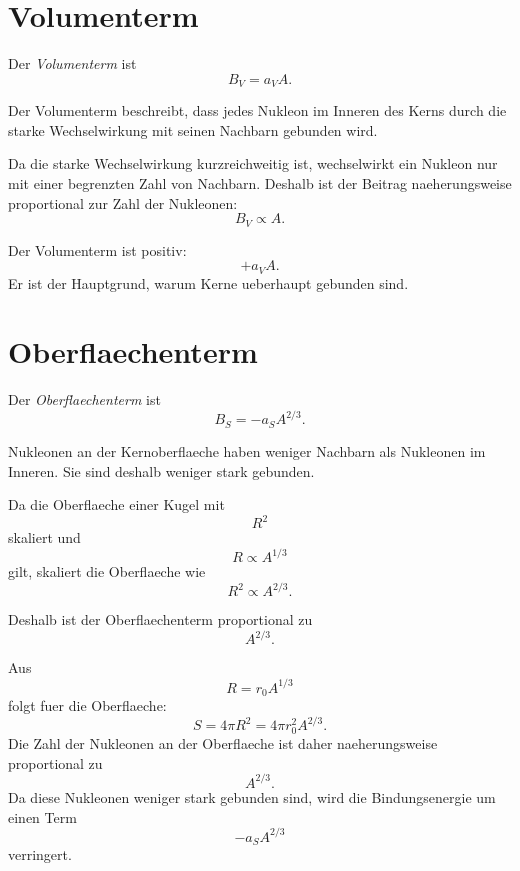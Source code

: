 \section{Volumenterm}

\begin{definitionbox}
Der \emph{Volumenterm} ist
\[
    B_V = a_V A.
\]
\end{definitionbox}

\begin{conceptbox}
Der Volumenterm beschreibt, dass jedes Nukleon im Inneren des Kerns durch die
starke Wechselwirkung mit seinen Nachbarn gebunden wird.

Da die starke Wechselwirkung kurzreichweitig ist, wechselwirkt ein Nukleon nur mit
einer begrenzten Zahl von Nachbarn.
Deshalb ist der Beitrag naeherungsweise proportional zur Zahl der Nukleonen:
\[
    B_V \propto A.
\]
\end{conceptbox}

\begin{examtipbox}
Der Volumenterm ist positiv:
\[
    +a_V A.
\]
Er ist der Hauptgrund, warum Kerne ueberhaupt gebunden sind.
\end{examtipbox}

\section{Oberflaechenterm}

\begin{definitionbox}
Der \emph{Oberflaechenterm} ist
\[
    B_S = -a_S A^{2/3}.
\]
\end{definitionbox}

\begin{conceptbox}
Nukleonen an der Kernoberflaeche haben weniger Nachbarn als Nukleonen im Inneren.
Sie sind deshalb weniger stark gebunden.

Da die Oberflaeche einer Kugel mit
\[
    R^2
\]
skaliert und
\[
    R \propto A^{1/3}
\]
gilt, skaliert die Oberflaeche wie
\[
    R^2 \propto A^{2/3}.
\]

Deshalb ist der Oberflaechenterm proportional zu
\[
    A^{2/3}.
\]
\end{conceptbox}

\begin{derivationbox}
Aus
\[
    R=r_0A^{1/3}
\]
folgt fuer die Oberflaeche:
\[
    S = 4\pi R^2
      = 4\pi r_0^2 A^{2/3}.
\]
Die Zahl der Nukleonen an der Oberflaeche ist daher naeherungsweise proportional zu
\[
    A^{2/3}.
\]
Da diese Nukleonen weniger stark gebunden sind, wird die Bindungsenergie um einen
Term
\[
    -a_SA^{2/3}
\]
verringert.
\end{derivationbox}

